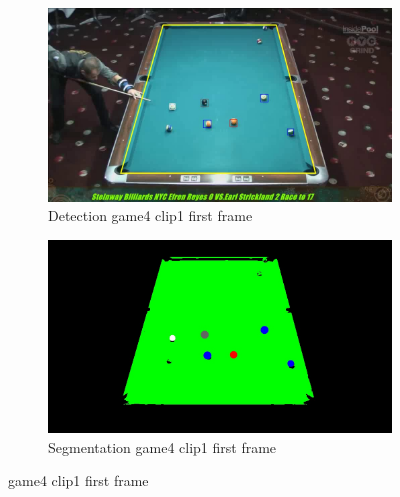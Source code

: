 \begin{figure}[H]
    \centering
    \begin{subfigure}[b]{0.4\textwidth}
        \centering
        \includegraphics[width=\textwidth]{images/Detection/game4_clip1_detected_balls_first_frame.jpg}
        \caption{Detection game4 clip1 first frame}
        \label{fig: game4_clip1_first_frame_detected}
    \end{subfigure}
    \begin{subfigure}[b]{0.4\textwidth}
        \centering
        \includegraphics[width=\textwidth]{images/Segmentation/game4_clip1_segmented_balls_first_frame.jpg}
        \caption{Segmentation game4 clip1 first frame}
		\label{fig: game4_clip1_first_frame_segmented}
    \end{subfigure}
	\caption{game4 clip1 first frame}
\end{figure}
